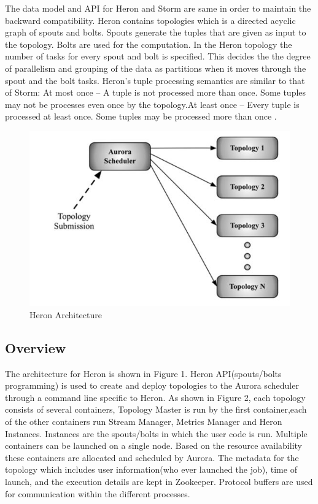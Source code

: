 \documentclass[9pt,twocolumn,twoside]{styles/osajnl}
\begin{document}
The data model and API for Heron and Storm are same in order to maintain the backward compatibility. Heron contains topologies which is a directed acyclic graph of spouts and bolts. Spouts generate the tuples that are given as input to the topology. Bolts are used for the computation. In the Heron topology the number of tasks for every spout and bolt is specified. This decides the the degree of parallelism and grouping of the data as partitions when it moves through the spout and the bolt tasks. Heron’s tuple processing semantics are similar to that of Storm: At most once – A tuple is not processed more than once. Some tuples may not be processes even once by the topology.At least once – Every tuple is processed at least once. Some tuples may be processed more than once \cite{TwitterHeron2}.
\begin{figure}[htbp]
\begin{center}
\centering
\includegraphics[width=\linewidth]{images/img1}
\caption{Heron Architecture \cite{TwitterHeron2}}
\label{fig:false-color}
\end{center}
\end{figure}
\subsection{Overview}
The architecture for Heron is shown in Figure 1. Heron API(spouts/bolts programming) is used to create and
deploy topologies to the Aurora scheduler through a command line specific to Heron. As shown in Figure 2, each topology consists of several containers, Topology Master is run by the first container,each of the other containers run Stream Manager, Metrics Manager and Heron Instances. Instances are the spouts/bolts in which the user code is run. Multiple containers can be launched on a single node. Based on the resource availability these containers are allocated and scheduled by Aurora. The metadata for the topology which includes user information(who ever launched the job), time of launch, and the execution details are kept in Zookeeper. Protocol buffers  are used for communication within the different processes.
\end{document}
